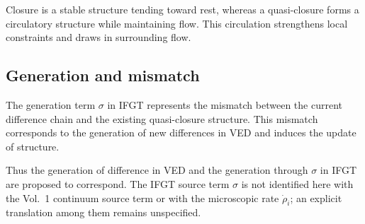 Closure is a stable structure tending toward rest, whereas a quasi-closure forms a circulatory structure while maintaining flow. This circulation strengthens local constraints and draws in surrounding flow.

\subsection{Generation and mismatch}
\label{subsec:generation_mismatch}

The generation term $\sigma$ in IFGT represents the mismatch between the current difference chain and the existing quasi-closure structure. This mismatch corresponds to the generation of new differences in VED and induces the update of structure.

Thus the generation of difference in VED and the generation through $\sigma$ in IFGT are proposed to correspond. The IFGT source term $\sigma$ is not identified here with the Vol.~1 continuum source term or with the microscopic rate $\dot\rho_i$; an explicit translation among them remains unspecified.

